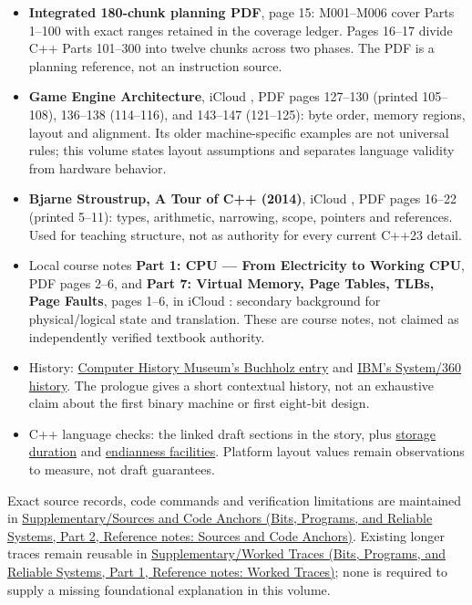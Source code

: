 \begin{itemize}
\tightlist
\item
  \textbf{Integrated 180-chunk planning PDF}, page 15: M001--M006 cover Parts 1--100 with exact ranges retained in the coverage ledger. Pages 16--17 divide C++ Parts 101--300 into twelve chunks across two phases. The PDF is a planning reference, not an instruction source.
\item
  \textbf{Game Engine Architecture}, iCloud , PDF pages 127--130 (printed 105--108), 136--138 (114--116), and 143--147 (121--125): byte order, memory regions, layout and alignment. Its older machine-specific examples are not universal rules; this volume states layout assumptions and separates language validity from hardware behavior.
\item
  \textbf{Bjarne Stroustrup, A Tour of C++ (2014)}, iCloud , PDF pages 16--22 (printed 5--11): types, arithmetic, narrowing, scope, pointers and references. Used for teaching structure, not as authority for every current C++23 detail.
\item
  Local course notes \textbf{Part 1: CPU --- From Electricity to Working CPU}, PDF pages 2--6, and \textbf{Part 7: Virtual Memory, Page Tables, TLBs, Page Faults}, pages 1--6, in iCloud : secondary background for physical/logical state and translation. These are course notes, not claimed as independently verified textbook authority.
\item
  History: \href{https://www.computerhistory.org/tdih/october/24/}{Computer History Museum's Buchholz entry} and \href{https://www.ibm.com/history/system-360}{IBM's System/360 history}. The prologue gives a short contextual history, not an exhaustive claim about the first binary machine or first eight-bit design.
\item
  C++ language checks: the linked draft sections in the story, plus \href{https://eel.is/c++draft/basic.stc}{storage duration} and \href{https://eel.is/c++draft/bit.endian}{endianness facilities}. Platform layout values remain observations to measure, not draft guarantees.
\end{itemize}

Exact source records, code commands and verification limitations are maintained in \href{../01-Bits-Programs-and-Reliable-Systems-P02/main.pdf\#nameddest=appendix-a103e7846d21}{Supplementary/Sources and Code Anchors (Bits, Programs, and Reliable Systems, Part 2, Reference notes: Sources and Code Anchors)}. Existing longer traces remain reusable in \href{../01-Bits-Programs-and-Reliable-Systems-P01/main.pdf\#nameddest=appendix-92ff77d4dfdc}{Supplementary/Worked Traces (Bits, Programs, and Reliable Systems, Part 1, Reference notes: Worked Traces)}; none is required to supply a missing foundational explanation in this volume.

